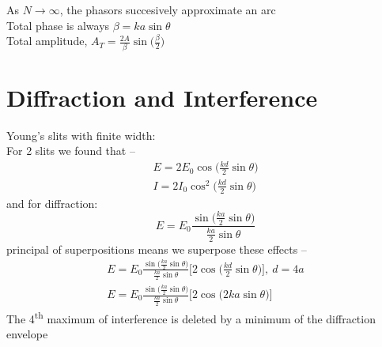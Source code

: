 \documentclass[a4paper, 11pt, fleqn, normalem]{report}
\begin{document}
As $N \rightarrow \infty$, the phasors succesively approximate an arc \\
Total phase is always $\beta = ka\sin{\theta}$ \\
Total amplitude, $A_{T} = \frac{2A}{\beta}\sin{\Big(\frac{\beta}{2}\Big)}$

\section{Diffraction and Interference}
Young's slits with finite width: \\
For 2 slits we found that --
\begin{gather*}
    E = 2E_{0}\cos{\Big(\frac{kd}{2}\sin{\theta}\Big)} \\
    I = 2I_{0}\cos^{2}{\Big(\frac{kd}{2}\sin{\theta}\Big)}
\end{gather*}
and for diffraction:
\begin{equation*}
    E = E_{0}\frac{\sin{\big(\tfrac{ka}{2}\sin{\theta}\big)}}{\tfrac{ka}{2}\sin{\theta}}
\end{equation*}
principal of superpositions means we superpose these effects --
\begin{gather*}
    E = E_{0}\frac{\sin{\big(\tfrac{ka}{2}\sin{\theta}\big)}}{\tfrac{ka}{2}\sin{\theta}}\Big[2\cos{\Big(\frac{kd}{2}\sin{\theta}\Big)}\Big],~d = 4a \\
    E = E_{0}\frac{\sin{\big(\tfrac{ka}{2}\sin{\theta}\big)}}{\tfrac{ka}{2}\sin{\theta}}\Big[2\cos{\Big(2ka\sin{\theta}\Big)}\Big]
\end{gather*}
The 4\textsuperscript{th} maximum of interference is deleted by a minimum of the diffraction envelope
\end{document}
